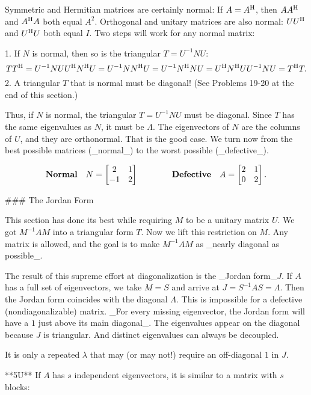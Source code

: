 Symmetric and Hermitian matrices are certainly normal: If \(A=A^{\rm H}\), then \(AA^{\rm H}\) and \(A^{\rm H}A\) both equal \(A^{2}\). Orthogonal and unitary matrices are also normal: \(UU^{\rm H}\) and \(U^{\rm H}U\) both equal \(I\). Two steps will work for any normal matrix:

1. If \(N\) is normal, then so is the triangular \(T=U^{-1}NU\): \[TT^{\rm H}=U^{-1}NUU^{\rm H}N^{\rm H}U=U^{-1}NN^{\rm H}U=U^{-1}N^{\rm H}NU=U^{ \rm H}N^{\rm H}UU^{-1}NU=T^{\rm H}T.\]
2. A triangular \(T\) that is normal must be diagonal! (See Problems 19-20 at the end of this section.)

Thus, if \(N\) is normal, the triangular \(T=U^{-1}NU\) must be diagonal. Since \(T\) has the same eigenvalues as \(N\), it must be \(\Lambda\). The eigenvectors of \(N\) are the columns of \(U\), and they are orthonormal. That is the good case. We turn now from the best possible matrices (_normal_) to the worst possible (_defective_).

\[\mbox{\bf Normal}\quad N=\begin{bmatrix}2&1\\ -1&2\end{bmatrix}\qquad\qquad\mbox{\bf Defective}\quad A=\begin{bmatrix}2&1\\ 0&2\end{bmatrix}.\]

### The Jordan Form

This section has done its best while requiring \(M\) to be a unitary matrix \(U\). We got \(M^{-1}AM\) into a triangular form \(T\). Now we lift this restriction on \(M\). Any matrix is allowed, and the goal is to make \(M^{-1}AM\) as _nearly diagonal as possible_.

The result of this supreme effort at diagonalization is the _Jordan form_\(J\). If \(A\) has a full set of eigenvectors, we take \(M=S\) and arrive at \(J=S^{-1}AS=\Lambda\). Then the Jordan form coincides with the diagonal \(\Lambda\). This is impossible for a defective (nondiagonalizable) matrix. _For every missing eigenvector, the Jordan form will have a \(1\) just above its main diagonal_. The eigenvalues appear on the diagonal because \(J\) is triangular. And distinct eigenvalues can always be decoupled.

It is only a repeated \(\lambda\) that may (or may not!) require an off-diagonal \(1\) in \(J\).

**5U** If \(A\) has \(s\) independent eigenvectors, it is similar to a matrix with \(s\) blocks:

